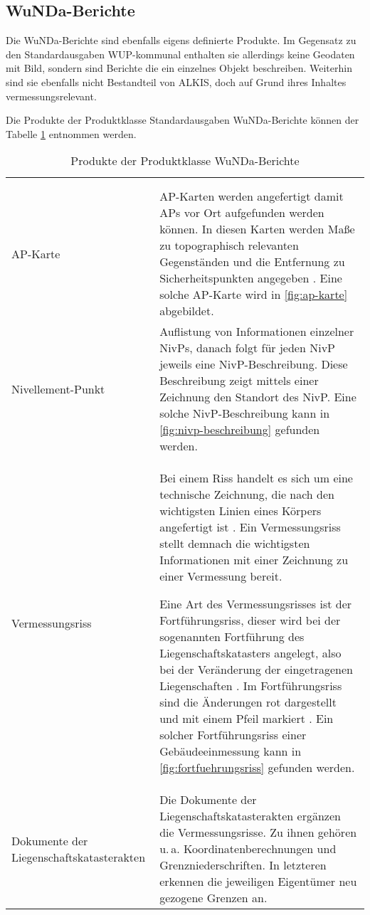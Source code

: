 \subsection{WuNDa-Berichte}
Die WuNDa-Berichte sind ebenfalls eigens definierte Produkte. Im Gegensatz zu den Standardausgaben WUP-kommunal enthalten sie allerdings keine Geodaten mit Bild, sondern sind Berichte die ein einzelnes Objekt beschreiben. Weiterhin sind sie ebenfalls nicht Bestandteil von ALKIS, doch auf Grund ihres Inhaltes vermessungsrelevant.

Die Produkte der Produktklasse Standardausgaben WuNDa-Berichte können der Tabelle \ref{tab-wunda-berichte} entnommen werden.
\begin{longtable}{|p{}|p{}|}	
	\caption{Produkte der Produktklasse WuNDa-Berichte} \label{tab-wunda-berichte} \\
	\hline 
		\rowcolor{gray}
	\head{Produktname}  & \head{Beschreibung} \tabularnewline
	\hline 
	\endfirsthead
	\caption*{Produkte der Produktklasse WuNDa-Berichte} \\
	\hline 
		\rowcolor{gray}
	\head{Produktname}  & \head{Beschreibung} \tabularnewline
	\hline 
	\endhead
	AP-Karte
	&
	AP-Karten werden angefertigt damit \acfp{AP} vor Ort aufgefunden werden können. In diesen Karten werden Maße zu topographisch relevanten Gegenständen und die Entfernung zu Sicherheitspunkten angegeben \autocite[vgl.][]{siegen-ap-karte}. Eine solche AP-Karte wird in \vref{fig:ap-karte} abgebildet.
	 \\
	\hline
	Nivellement-Punkt
	&
	Auflistung von Informationen einzelner \acfp{NivP}, danach folgt für jeden NivP jeweils eine NivP-Beschreibung. Diese Beschreibung zeigt mittels einer Zeichnung den Standort des NivP. Eine solche NivP-Beschreibung kann in \ref{fig:nivp-beschreibung} gefunden werden.  \\
	\hline
	Vermessungsriss
	&
	Bei einem Riss handelt es sich um eine technische Zeichnung, die nach den wichtigsten Linien eines Körpers angefertigt ist \autocite[vgl.][]{duden-riss}. Ein Vermessungsriss stellt demnach die wichtigsten Informationen mit einer Zeichnung zu einer Vermessung bereit.
	
	Eine Art des Vermessungsrisses ist der Fortführungsriss, dieser wird bei der sogenannten Fortführung des Liegenschaftskatasters angelegt, also bei der Veränderung der eingetragenen Liegenschaften \autocite[vgl.][]{vermpedia-fortfuehrung}.
	Im Fortführungsriss sind die Änderungen rot dargestellt und mit einem Pfeil markiert \autocite[vgl.][]{stelling-fortfuehrung}. Ein solcher Fortführungsriss einer Gebäudeeinmessung kann in \ref{fig:fortfuehrungsriss} gefunden werden.
	 \\
	\hline
	Dokumente der Liegenschaftskatasterakten
	&
	Die Dokumente der Liegenschaftskatasterakten ergänzen die Vermessungsrisse. Zu ihnen gehören u.\,a. Koordinatenberechnungen und Grenzniederschriften. In letzteren erkennen die jeweiligen Eigentümer neu gezogene Grenzen an.  \\
	\hline
\end{longtable} 
	
